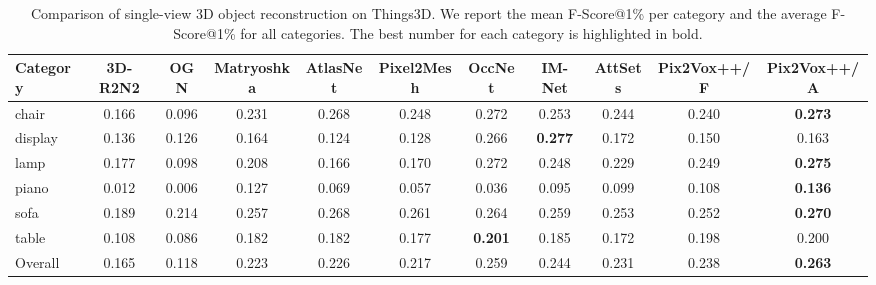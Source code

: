 \documentclass[twocolumn]{svjour3}
\begin{document}
\begin{table*}[!t]
  \caption{Comparison of single-view 3D object reconstruction on Things3D. We report the mean F-Score@1\% per category and the average F-Score@1\% for all categories. The best number for each category is highlighted in bold.}
  \resizebox{\linewidth}{!} {
    \begin{tabular}{lcccccccccc}
      \toprule
      Category     & 3D-R2N2    & OGN        & Matryoshka
                   & AtlasNet   & Pixel2Mesh & OccNet
                   & IM-Net     & AttSets    
                   & Pix2Vox++/F& Pix2Vox++/A \\
      \midrule
      chair        & 0.166      & 0.096      & 0.231
                   & 0.268      & 0.248      & 0.272
                   & 0.253      & 0.244
                   & 0.240      & \bf{0.273} \\
      display      & 0.136      & 0.126      & 0.164
                   & 0.124      & 0.128      & 0.266
                   & \bf{0.277} & 0.172
                   & 0.150      & 0.163 \\
      lamp         & 0.177      & 0.098      & 0.208
                   & 0.166      & 0.170      & 0.272
                   & 0.248      & 0.229
                   & 0.249      & \bf{0.275} \\
      piano        & 0.012      & 0.006      & 0.127
                   & 0.069      & 0.057      & 0.036
                   & 0.095      & 0.099
                   & 0.108      & \bf{0.136} \\
      sofa         & 0.189      & 0.214      & 0.257
                   & 0.268      & 0.261      & 0.264
                   & 0.259      & 0.253
                   & 0.252      & \bf{0.270} \\
      table        & 0.108      & 0.086      & 0.182
                   & 0.182      & 0.177      & \bf{0.201}
                   & 0.185      & 0.172
                   & 0.198      & 0.200 \\
      \midrule
      Overall      & 0.165      & 0.118      & 0.223
                   & 0.226      & 0.217      & 0.259
                   & 0.244      & 0.231
                   & 0.238      & \bf{0.263} \\
      \bottomrule
    \end{tabular}
  }
  \label{tab:things3d-voxel-reconstruction-fscore}
\end{table*}
\end{document}
